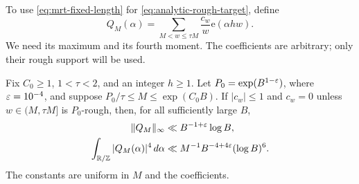To use \eqref{eq:mrt-fixed-length} for
\eqref{eq:analytic-rough-target}, define
\begin{equation}\label{eq:rough-multiplier}
 Q_M(\alpha)=\sum_{M<w\le\tau M}\frac{c_w}{w}\mathrm e(\alpha hw).
\end{equation}
We need its maximum and its fourth moment. The coefficients are
arbitrary; only their rough support will be used.

\begin{lemma}\label{lem:rough-multiplier}
Fix $C_0\ge1$, $1<\tau<2$, and an integer $h\ge1$. Let
$P_0=\exp(B^{1-\varepsilon})$, where $\varepsilon=10^{-4}$, and suppose
$P_0/\tau\le M\le\exp(C_0B)$. If $|c_w|\le1$ and $c_w=0$ unless
$w\in(M,\tau M]$ is $P_0$-rough, then, for all sufficiently large $B$,
\begin{align}
 \|Q_M\|_\infty&\ll B^{-1+\varepsilon}\log B,
 \label{eq:rough-sup}\\
 \int_{\mathbb R/\mathbb Z}|Q_M(\alpha)|^4\,d\alpha
 &\ll M^{-1}B^{-4+4\varepsilon}(\log B)^6.
 \label{eq:rough-fourth}
\end{align}
The constants are uniform in $M$ and the coefficients.
\end{lemma}
